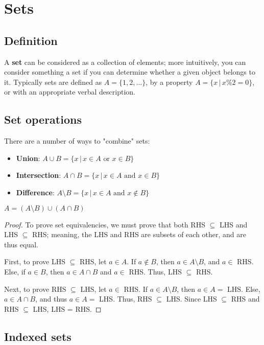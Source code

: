 \documentclass[12pt,oneside]{article}
\begin{document}
\section{Sets}
\subsection{Definition}
A \textbf{set} can be considered as a collection of elements; more intuitively, you can consider something a set if you can determine whether a given object belongs to it. Typically sets are defined as $A = \{1, 2, \dots\}$, by a property $A = \{x \,|\, x\%2 = 0\}$, or with an appropriate verbal description.

\subsection{Set operations}
There are a number of ways to "combine" sets:

\begin{itemize}
  \item \textbf{Union}: $A \cup B = \{x \,|\, x \in A \text{ or } x \in B\}$ 
  \item \textbf{Intersection}: $A \cap B = \{x \,|\, x \in A \text{ and } x \in B\}$ 
  \item \textbf{Difference}: $A \setminus B = \{x \,|\, x \in A \text{ and } x \notin B\}$ 
\end{itemize}

\begin{lemma}
  $A = (A\setminus B)\cup(A\cap B)$
\end{lemma}
\begin{proof}
  To prove set equivalencies, we must prove that both RHS $\subseteq$ LHS and LHS $\subseteq$ RHS; meaning, the LHS and RHS are subsets of each other, and are thus equal.
  
  First, to prove LHS $\subseteq$ RHS, let $a \in A$. If $a \notin B$, then $a \in A\setminus B$, and $a \in$ RHS. Else, if $a \in B$, then $a \in A \cap B$ and $a \in$ RHS. Thus, LHS $\subseteq$ RHS.

  Next, to prove RHS $\subseteq$ LHS, let $a \in $ RHS. If $a \in A \setminus B$, then $a \in A=$ LHS. Else, $a \in A \cap B$, and thus $a \in A=$ LHS. Thus, RHS $\subseteq$ LHS.
  Since LHS $\subseteq$ RHS and RHS $\subseteq$ LHS, LHS = RHS.
\end{proof}

\subsection{Indexed sets}
\end{document}
